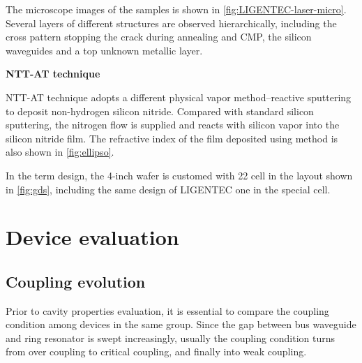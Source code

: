 The microscope images of the samples is shown in \autoref{fig:LIGENTEC-laser-micro}. Several layers of different structures are observed hierarchically, including the cross pattern stopping the crack during annealing and CMP, the silicon waveguides and a top unknown metallic layer.

\begin{figure}
	\centering
	
	\label{fig:gds}
\end{figure}

\begin{figure}
	\centering
	
	\label{fig:LIGENTEC-laser-micro}
\end{figure}

\bigskip
\noindent\textbf{NTT-AT technique}

NTT-AT technique adopts a different physical vapor method--reactive sputtering to deposit non-hydrogen silicon nitride. Compared with standard silicon sputtering, the nitrogen flow is supplied and reacts with silicon vapor into the silicon nitride film. The refractive index of the film deposited using method is also shown in \autoref{fig:ellipso}.

In the term design, the 4-inch wafer is customed with 22 cell in the layout shown in \autoref{fig:gds}, including the same design of LIGENTEC one in the special cell.



\section{Device evaluation}

\subsection{Coupling evolution}

Prior to cavity properties evaluation, it is essential to compare the coupling condition among devices in the same group. Since the gap between bus waveguide and ring resonator is swept increasingly, usually the coupling condition turns from over coupling to critical coupling, and finally into weak coupling.

